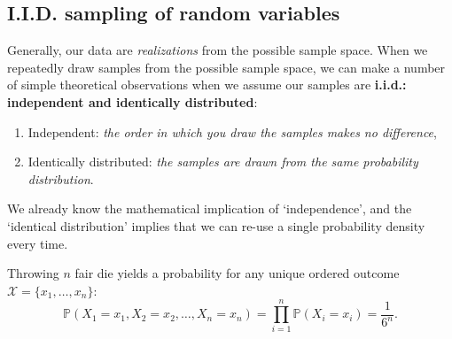 \documentclass{article}
\begin{document}
\subsection{I.I.D. sampling of random variables}
Generally, our data are \textit{realizations} from the possible sample space. When we repeatedly draw samples from the possible sample space, we can make a number of simple theoretical observations when we assume our samples are \textbf{i.i.d.: independent and identically distributed}:
\begin{enumerate}\itemsep0em
    \item Independent: \textit{the order in which you draw the samples makes no difference},
    \item Identically distributed: \textit{the samples are drawn from the same probability distribution}.
\end{enumerate}
We already know the mathematical implication of `independence', and the `identical distribution' implies that we can re-use a single probability density every time. 
\begin{testexample}
    Throwing $n$ fair die yields a probability for any unique ordered outcome $\mathcal{X}=\{x_1,\dots,x_n\}$:
    \vspace{-0.3cm}
    \begin{equation}
        \mathbb{P}(X_1=x_1,X_2=x_2,\dots,X_n=x_n) = \prod_{i=1}^n \mathbb{P}(X_i=x_i) = \frac{1}{6^n}.
    \end{equation}
\end{testexample}
\end{document}
